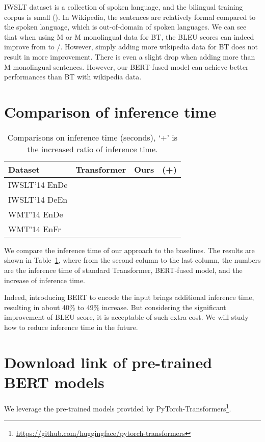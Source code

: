 \documentclass{article} \usepackage{iclr2020_conference,times}
\begin{document}
IWSLT dataset is a collection of spoken language, and the bilingual training corpus is small (). In Wikipedia, the sentences are relatively formal compared to the spoken language, which is  out-of-domain of spoken languages. We can see that when using M or M monolingual data for BT, the BLEU scores can indeed improve from  to /. However, simply adding more wikipedia data for BT does not result in more improvement. There is even a slight drop when adding more than M monolingual sentences. However, our BERT-fused model can achieve better performances than BT with wikipedia data.







\section{Comparison of inference time}\label{sec:infer_time}
\begin{table}[!htbp]
\centering
\caption{Comparisons on inference time (seconds), `+' is the increased ratio of inference time.}
\begin{tabular}{lccc}
\toprule
Dataset & Transformer & Ours & (+) \\
\midrule
IWSLT'14 EnDe &  &  &  \\
IWSLT'14 DeEn &  &  &  \\
WMT'14 EnDe   &  &   &  \\
WMT'14 EnFr   &  &  &  \\
\bottomrule
\end{tabular}
\label{tab:statistics_compare_bert_and_nmt}
\end{table}
We compare the inference time of our approach to the baselines. The results are shown in Table~\ref{tab:statistics_compare_bert_and_nmt},
where from the second column to the last column, the numbers are the inference time of standard Transformer, BERT-fused model, and the increase of inference time.

Indeed, introducing BERT to encode the input brings additional inference time, resulting in about 40\% to 49\% increase. But considering the significant improvement of BLEU score, it is acceptable of such extra cost. We will study how to reduce inference time in the future. 

\section{Download link of pre-trained BERT models}\label{app:pretrained_bert_models}
\label{app:model_download}
We leverage the pre-trained models provided by PyTorch-Transformers\footnote{\url{https://github.com/huggingface/pytorch-transformers}}.
\end{document}
